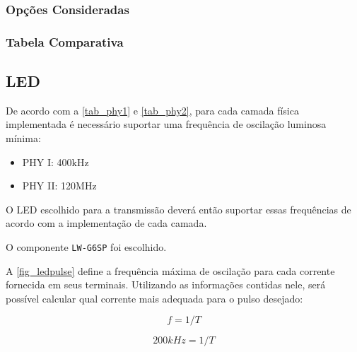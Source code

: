 	
	\subsubsection{Opções Consideradas}\label{uc-options}
	
	\subsubsection{Tabela Comparativa}\label{uc-table}
	
	\subsection{LED}\label{hard-led}
	
	De acordo com a \autoref{tab_phy1} e \autoref{tab_phy2}, para cada camada física implementada é necessário suportar uma frequência de oscilação luminosa mínima:
	
	\begin{itemize}
		\item PHY I: 400kHz
		\item PHY II: 120MHz
	\end{itemize} 
	
	O LED escolhido para a transmissão deverá então suportar essas frequências de acordo com a implementação de cada camada. 
	
	O componente \texttt{LW-G6SP} foi escolhido.
	
	A \autoref{fig_ledpulse} define a frequência máxima de oscilação para cada corrente fornecida em seus terminais. Utilizando as informações contidas nele, será possível calcular qual corrente mais adequada para o pulso desejado:
	
	\begin{equation} \label{eq:5}
		f = 1 / T
	\end{equation}
	
	\begin{equation}
	200kHz = 1 / T
	\end{equation}
	
